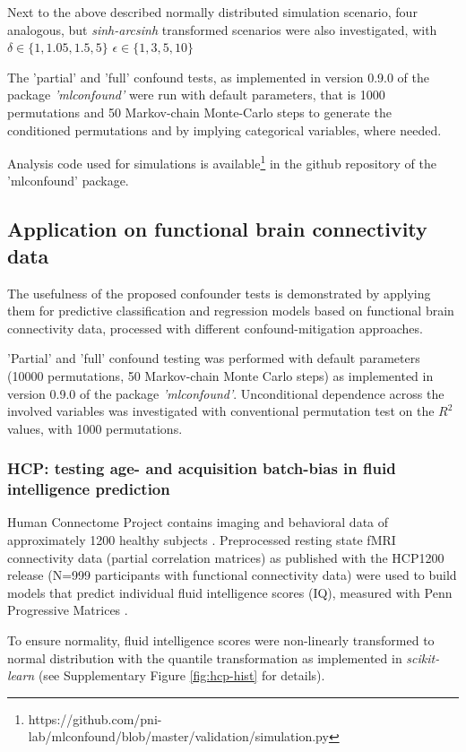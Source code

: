 \documentclass{article}
\begin{document}
Next to the above described normally distributed simulation scenario, four analogous, but \emph{sinh-arcsinh} transformed scenarios were also investigated, with $\delta \in \{1, 1.05, 1.5, 5\}$ $\epsilon \in \{1, 3, 5, 10\}$ 

The 'partial' and 'full' confound tests, as implemented in version 0.9.0 of the package \emph{'mlconfound'} were run with default parameters, that is 1000 permutations and 50 Markov-chain Monte-Carlo steps to generate the conditioned permutations and by implying categorical variables, where needed.

Analysis code used for simulations is available\footnote{https://github.com/pni-lab/mlconfound/blob/master/validation/simulation.py} in the github repository of the 'mlconfound' package.

\subsection{Application on functional brain connectivity data}

The usefulness of the proposed confounder tests is demonstrated by applying them for predictive classification and regression models based on functional brain connectivity data, processed with different confound-mitigation approaches. 

'Partial' and 'full' confound testing was performed with default parameters (10000 permutations, 50 Markov-chain Monte Carlo steps) as implemented in version 0.9.0 of the package \emph{'mlconfound'}. Unconditional dependence across the involved variables was investigated with conventional permutation test on the $R^2$ values, with 1000 permutations. 

\subsubsection*{HCP: testing age- and acquisition batch-bias in fluid intelligence prediction}

Human Connectome Project contains imaging and behavioral data of approximately 1200 healthy subjects \citep{van2013wu}. Preprocessed resting state fMRI connectivity data (partial correlation matrices) \citep{glasser2013minimal} as published with the HCP1200 release (N=999 participants with functional connectivity data) were used to build models that predict individual fluid intelligence scores (IQ), measured with Penn Progressive Matrices \citep{duncan2000neural}.

To ensure normality, fluid intelligence scores were non-linearly transformed to normal distribution with the quantile transformation \citep{beasley2009rank} as implemented in \emph{scikit-learn} \citep{pedregosa2011scikit} (see Supplementary Figure \ref{fig:hcp-hist} for details).
\end{document}
